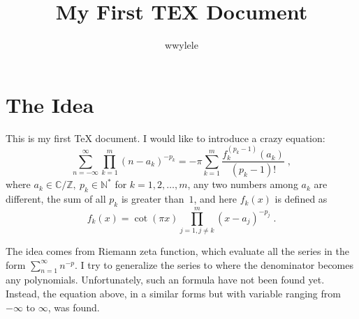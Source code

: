 \documentclass[10pt,a4paper]{article}
\author{wwylele}
\title{My First TEX Document}
\begin{document}
	\newcommand{\ud}{\mathrm{d}}
	\newcommand{\res}{\operatorname{Res}}
	\newcommand{\zetaf}{\operatorname{\zeta}}
	\section{The Idea}
	This is my first \TeX{} document. I would like to introduce a crazy equation:
	\begin{equation}
	\sum_{n=-\infty}^{\infty}\prod_{k=1}^{m}(n-a_k ) ^{-p_k}
	=-\pi\sum_{k=1}^{m}\frac{f_k^{(p_k-1 ) }(a_k )}{( p_k-1) !}  \; ,
	\label{eqn:main}
	\end{equation}
	where $a_k\in\mathbb{C}/\mathbb{Z},\:p_k\in\mathbb{N}^*$ for $k=1,2,\ldots,m$, any two numbers among $a_k$ are different, the sum of all $p_k$ is greater than~$1$, and here $f_k(x)$ is defined as
	\[
	f_k(x)= \cot( \pi x)\prod_{j=1,j\neq k}^{m}( x-a_j) ^{-p_j} \; .
	\]
	
	The idea comes from Riemann zeta function, which evaluate all the series in the form $\sum_{n=1}^{\infty}n^{-p}$. I try to generalize the series to where the denominator becomes any polynomials. Unfortunately, such an formula have not been found yet. Instead, the equation above, in a similar forms but with variable ranging from~$-\infty$ to $\infty$, was found.
\end{document}
